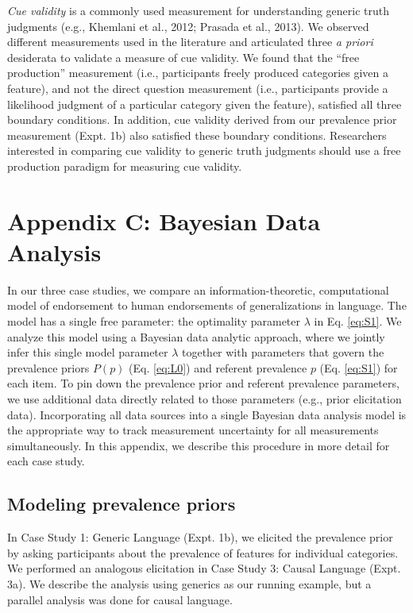 \documentclass[english,,man,floatsintext]{apa6}
\theoremstyle{definition}
\theoremstyle{definition}
\theoremstyle{definition}
\theoremstyle{remark}
\begin{document}
\emph{Cue validity} is a commonly used measurement for understanding
generic truth judgments (e.g., Khemlani et al., 2012; Prasada et al.,
2013). We observed different measurements used in the literature and
articulated three \emph{a priori} desiderata to validate a measure of
cue validity. We found that the \enquote{free production} measurement
(i.e., participants freely produced categories given a feature), and not
the direct question measurement (i.e., participants provide a likelihood
judgment of a particular category given the feature), satisfied all
three boundary conditions. In addition, cue validity derived from our
prevalence prior measurement (Expt. 1b) also satisfied these boundary
conditions. Researchers interested in comparing cue validity to generic
truth judgments should use a free production paradigm for measuring cue
validity.

\newpage

\hypertarget{appendix-c-bayesian-data-analysis}{%
\section{Appendix C: Bayesian Data
Analysis}\label{appendix-c-bayesian-data-analysis}}

In our three case studies, we compare an information-theoretic,
computational model of endorsement to human endorsements of
generalizations in language. The model has a single free parameter: the
optimality parameter \(\lambda\) in Eq. \ref{eq:S1}. We analyze this
model using a Bayesian data analytic approach, where we jointly infer
this single model parameter \(\lambda\) together with parameters that
govern the prevalence priors \(P(p)\) (Eq. \ref{eq:L0}) and referent
prevalence \(p\) (Eq. \ref{eq:S1}) for each item. To pin down the
prevalence prior and referent prevalence parameters, we use additional
data directly related to those parameters (e.g., prior elicitation
data). Incorporating all data sources into a single Bayesian data
analysis model is the appropriate way to track measurement uncertainty
for all measurements simultaneously. In this appendix, we describe this
procedure in more detail for each case study.

\hypertarget{modeling-prevalence-priors}{%
\subsection{Modeling prevalence
priors}\label{modeling-prevalence-priors}}

In Case Study 1: Generic Language (Expt. 1b), we elicited the prevalence
prior by asking participants about the prevalence of features for
individual categories. We performed an analogous elicitation in Case
Study 3: Causal Language (Expt. 3a). We describe the analysis using
generics as our running example, but a parallel analysis was done for
causal language.
\end{document}
